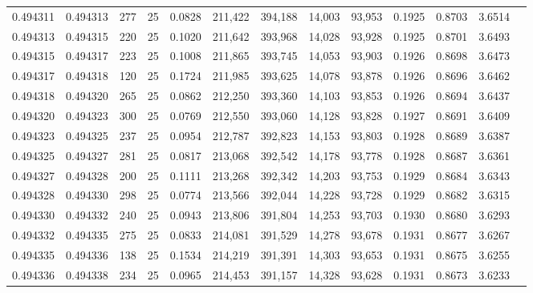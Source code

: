 \begin{tabular}{rrrrrrrrrrrrr}
0.494311 & 0.494313 &   277 &  25 &                                     0.0828 & 211,422 & 394,188 &  14,003 &  93,953 & 0.1925 & 0.8703 & 3.6514 \\
0.494313 & 0.494315 &   220 &  25 &                                     0.1020 & 211,642 & 393,968 &  14,028 &  93,928 & 0.1925 & 0.8701 & 3.6493 \\
0.494315 & 0.494317 &   223 &  25 &                                     0.1008 & 211,865 & 393,745 &  14,053 &  93,903 & 0.1926 & 0.8698 & 3.6473 \\
0.494317 & 0.494318 &   120 &  25 &                                     0.1724 & 211,985 & 393,625 &  14,078 &  93,878 & 0.1926 & 0.8696 & 3.6462 \\
0.494318 & 0.494320 &   265 &  25 &                                     0.0862 & 212,250 & 393,360 &  14,103 &  93,853 & 0.1926 & 0.8694 & 3.6437 \\
0.494320 & 0.494323 &   300 &  25 &                                     0.0769 & 212,550 & 393,060 &  14,128 &  93,828 & 0.1927 & 0.8691 & 3.6409 \\
0.494323 & 0.494325 &   237 &  25 &                                     0.0954 & 212,787 & 392,823 &  14,153 &  93,803 & 0.1928 & 0.8689 & 3.6387 \\
0.494325 & 0.494327 &   281 &  25 &                                     0.0817 & 213,068 & 392,542 &  14,178 &  93,778 & 0.1928 & 0.8687 & 3.6361 \\
0.494327 & 0.494328 &   200 &  25 &                                     0.1111 & 213,268 & 392,342 &  14,203 &  93,753 & 0.1929 & 0.8684 & 3.6343 \\
0.494328 & 0.494330 &   298 &  25 &                                     0.0774 & 213,566 & 392,044 &  14,228 &  93,728 & 0.1929 & 0.8682 & 3.6315 \\
0.494330 & 0.494332 &   240 &  25 &                                     0.0943 & 213,806 & 391,804 &  14,253 &  93,703 & 0.1930 & 0.8680 & 3.6293 \\
0.494332 & 0.494335 &   275 &  25 &                                     0.0833 & 214,081 & 391,529 &  14,278 &  93,678 & 0.1931 & 0.8677 & 3.6267 \\
0.494335 & 0.494336 &   138 &  25 &                                     0.1534 & 214,219 & 391,391 &  14,303 &  93,653 & 0.1931 & 0.8675 & 3.6255 \\
0.494336 & 0.494338 &   234 &  25 &                                     0.0965 & 214,453 & 391,157 &  14,328 &  93,628 & 0.1931 & 0.8673 & 3.6233 \\

\end{tabular}
